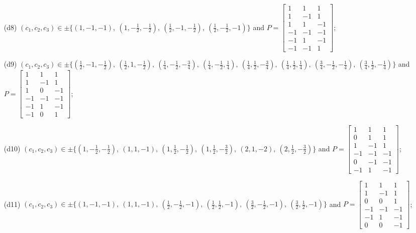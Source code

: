 \begin{enumerate}
\item[(d8)] $(c_1,c_2,c_3)\in \pm\{(1,-1,-1),\allowbreak\ (1,-\tfrac{1}{2},-\tfrac{1}{2}),\allowbreak\ (\tfrac{1}{2},-1,-\tfrac{1}{2}),\allowbreak\ (\tfrac{1}{2},-\tfrac{1}{2},-1)\}$ and $P=\begin{bmatrix}1&1&1\\1&-1&1\\1&1&-1\\-1&-1&-1\\-1&1&-1\\-1&-1&1\end{bmatrix}$;
\item[(d9)] $(c_1,c_2,c_3)\in \pm\{(\tfrac{1}{2},-1,-\tfrac{1}{2}),\allowbreak\ (\tfrac{1}{2},1,-\tfrac{1}{2}),\allowbreak\ (\tfrac{1}{4},-\tfrac{1}{2},-\tfrac{3}{4}),\allowbreak\ (\tfrac{1}{4},-\tfrac{1}{2},\tfrac{1}{4}),\allowbreak\ (\tfrac{1}{4},\tfrac{1}{2},-\tfrac{3}{4}),\allowbreak\ (\tfrac{1}{4},\tfrac{1}{2},\tfrac{1}{4}),\allowbreak\ (\tfrac{3}{4},-\tfrac{1}{2},-\tfrac{1}{4}),\allowbreak\ (\tfrac{3}{4},\tfrac{1}{2},-\tfrac{1}{4})\}$ and $P=\begin{bmatrix}1&1&1\\1&-1&1\\1&0&-1\\-1&-1&-1\\-1&1&-1\\-1&0&1\end{bmatrix}$;
\item[(d10)] $(c_1,c_2,c_3)\in \pm\{(1,-\tfrac{1}{2},-\tfrac{1}{2}),\allowbreak\ (1,1,-1),\allowbreak\ (1,\tfrac{1}{2},-\tfrac{1}{2}),\allowbreak\ (1,\tfrac{1}{2},-\tfrac{3}{2}),\allowbreak\ (2,1,-2),\allowbreak\ (2,\tfrac{1}{2},-\tfrac{3}{2})\}$ and $P=\begin{bmatrix}1&1&1\\0&1&1\\1&-1&1\\-1&-1&-1\\0&-1&-1\\-1&1&-1\end{bmatrix}$;
\item[(d11)] $(c_1,c_2,c_3)\in \pm\{(1,-1,-1),\allowbreak\ (1,1,-1),\allowbreak\ (\tfrac{1}{2},-\tfrac{1}{2},-1),\allowbreak\ (\tfrac{1}{2},\tfrac{1}{2},-1),\allowbreak\ (\tfrac{3}{2},-\tfrac{1}{2},-1),\allowbreak\ (\tfrac{3}{2},\tfrac{1}{2},-1)\}$ and $P=\begin{bmatrix}1&1&1\\1&-1&1\\0&0&1\\-1&-1&-1\\-1&1&-1\\0&0&-1\end{bmatrix}$;

\end{enumerate}
